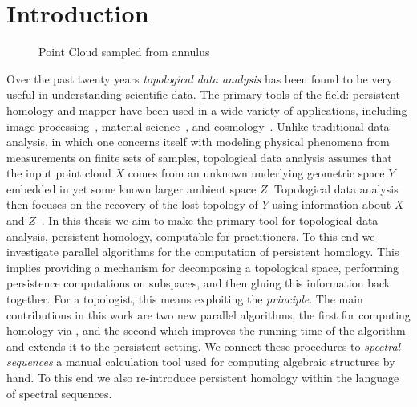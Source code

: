 \chapter{Introduction}
\begin{figure}
\centering
{}      
 \hspace{.5cm}
 \caption{Point Cloud sampled from annulus}
\label{fig:point-cloud-annulus}
 \end{figure}
Over the past twenty years \emph{topological data analysis} has been found to be very useful in understanding scientific data. The primary tools of the field: persistent homology and mapper have been used in a wide variety of applications, including image processing~\cite{cid-lbs-08}, material science~\cite{SW-measuring-shape}, and cosmology~\cite{cosmic-web}. Unlike traditional data analysis, in which one concerns itself with modeling physical phenomena from measurements on finite sets of samples, topological data analysis assumes that the input point cloud $X$ comes from an unknown underlying geometric space $Y$ embedded in yet some known larger ambient space $Z$. Topological data analysis then focuses on the recovery of the lost topology of $Y$ using information about $X$ and $Z$~\cite{c-tnd-09}. In this thesis we aim to make the primary tool for topological data analysis, persistent homology, computable for practitioners. To this end we investigate parallel algorithms for the computation of persistent homology. This implies providing a mechanism for decomposing a topological space, performing persistence computations on subspaces, and then gluing this information back together. For a topologist, this means exploiting the \emph{\mv principle}. The main contributions in this work are two new parallel algorithms, the first for computing homology via \mv, and the second which improves the running time of the algorithm and extends it to the persistent setting. We connect these procedures to \emph{spectral sequences} a manual calculation tool used for computing algebraic structures by hand. To this end we also re-introduce persistent homology within the language of spectral sequences.


